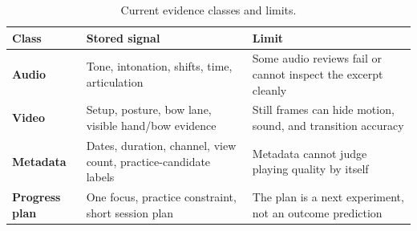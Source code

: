 \documentclass[12pt,letterpaper]{article}
\begin{document}
\begin{table}[htbp]
\centering
\caption{Current evidence classes and limits.}
\label{tab:evidence}
\begin{tabularx}{\textwidth}{>{\bfseries}p{}X X}
\toprule
Class & Stored signal & Limit \\
\midrule
Audio & Tone, intonation, shifts, time, articulation & Some audio reviews fail or cannot inspect the excerpt cleanly \\
Video & Setup, posture, bow lane, visible hand/bow evidence & Still frames can hide motion, sound, and transition accuracy \\
Metadata & Dates, duration, channel, view count, practice-candidate labels & Metadata cannot judge playing quality by itself \\
Progress plan & One focus, practice constraint, short session plan & The plan is a next experiment, not an outcome prediction \\
\bottomrule
\end{tabularx}
\end{table}
\end{document}
